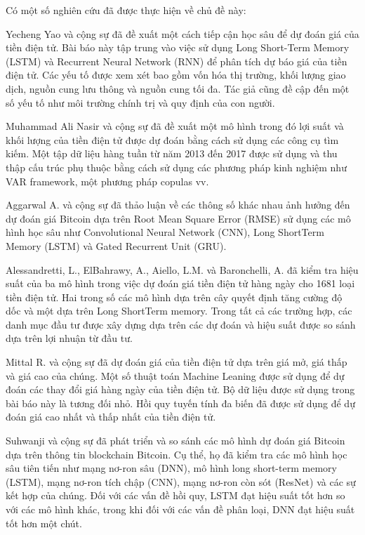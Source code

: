 \documentclass[conference]{IEEEtran}
\begin{document}
	Có một số nghiên cứu đã được thực hiện về chủ đề này:\par
	Yecheng Yao và cộng sự \cite{b1} đã đề xuất một cách tiếp cận học sâu để dự đoán giá của tiền điện tử. Bài báo này tập trung vào việc sử dụng Long Short-Term Memory (LSTM) và Recurrent Neural Network (RNN) để phân tích dự báo giá của tiền điện tử. Các yếu tố được xem xét bao gồm vốn hóa thị trường, khối lượng giao dịch, nguồn cung lưu thông và nguồn cung tối đa. Tác giả cũng đề cập đến một số yếu tố như môi trường chính trị và quy định của con người.\par
	Muhammad Ali Nasir và cộng sự \cite{b2} đã đề xuất một mô hình trong đó lợi suất và khối lượng của tiền điện tử được dự đoán bằng cách sử dụng các công cụ tìm kiếm. Một tập dữ liệu hàng tuần từ năm 2013 đến 2017 được sử dụng và thu thập cấu trúc phụ thuộc bằng cách sử dụng các phương pháp kinh nghiệm như VAR framework, một phương pháp copulas vv.\par
	Aggarwal A. và cộng sự \cite{b3} đã thảo luận về các thông số khác nhau ảnh hưởng đến dự đoán giá Bitcoin dựa trên Root Mean Square Error (RMSE) sử dụng các mô hình học sâu như Convolutional Neural Network (CNN), Long ShortTerm Memory (LSTM) và Gated Recurrent Unit (GRU).\par
	Alessandretti, L., ElBahrawy, A., Aiello, L.M. và Baronchelli, A. \cite{b4} đã kiểm tra hiệu suất của ba mô hình trong việc dự đoán giá tiền điện tử hàng ngày cho 1681 loại tiền điện tử. Hai trong số các mô hình dựa trên cây quyết định tăng cường độ dốc và một dựa trên Long ShortTerm memory. Trong tất cả các trường hợp, các danh mục đầu tư được xây dựng dựa trên các dự đoán và hiệu suất được so sánh dựa trên lợi nhuận từ đầu tư.\par
	Mittal R. và cộng sự \cite{b5} đã dự đoán giá của tiền điện tử dựa trên giá mở, giá thấp và giá cao của chúng. Một số thuật toán Machine Leaning được sử dụng để dự đoán các thay đổi giá hàng ngày của tiền điện tử. Bộ dữ liệu được sử dụng trong bài báo này là tương đối nhỏ. Hồi quy tuyến tính đa biến đã được sử dụng để dự đoán giá cao nhất và thấp nhất của tiền điện tử.\par
	Suhwanji và cộng sự \cite{b6} đã phát triển và so sánh các mô hình dự đoán giá Bitcoin dựa trên thông tin blockchain Bitcoin. Cụ thể, họ đã kiểm tra các mô hình học sâu tiên tiến như mạng nơ-ron sâu (DNN), mô hình long short-term memory (LSTM), mạng nơ-ron tích chập (CNN), mạng nơ-ron còn sót (ResNet) và các sự kết hợp của chúng. Đối với các vấn đề hồi quy, LSTM đạt hiệu suất tốt hơn so với các mô hình khác, trong khi đối với các vấn đề phân loại, DNN đạt hiệu suất tốt hơn một chút.\par
\end{document}
